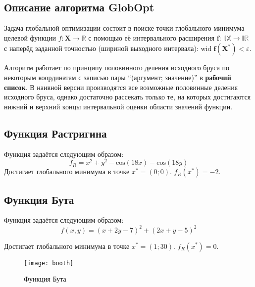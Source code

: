 \subsection{Описание алгоритма GlobOpt}

Задача глобальной оптимизации состоит в поиске точки глобального минимума целевой функции $f: \mathbf{X} \rightarrow \mathbb{R}$ с помощью её интервального расширения $\mathbf{f}: \; \mathbb{IX} \rightarrow \mathbb{IR}$ с наперёд заданной точностью (шириной выходного интервала): $\textrm{wid} \; \mathbf{f(X^*)} < \varepsilon$.

Алгоритм \cite{globopt} работает по принципу половинного деления исходного бруса по некоторым координатам с записью пары ``(аргумент; значение)'' в \textbf{рабочий список}. В наивной версии производятся все возможные половинные деления исходного бруса, однако достаточно рассекать только те, на которых достигаются нижний и верхний концы интервальной оценки области значений функции.

\subsection{Функция Растригина}
Функция задаётся следующим образом:
\begin{equation}
f_R = x^2 + y ^ 2 - \textrm{cos}(18x) - \textrm{cos}(18y)
\end{equation}
Достигает глобального минимума в точке $x^*=(0;0)$. $f_R(x^*)=-2$.

\subsection{Функция Бута}
Функция задаётся следующим образом:
\begin{equation}
f(x, y) = (x + 2y - 7) ^ 2 + (2x + y - 5) ^ 2
\end{equation}

Достигает глобального минимума в точке $x^*=(1;30)$. $f_R(x^*)=0$.

\begin{figure}[H]
	\begin{center}
		\texttt{[image: booth]}
		\label{pic:degenmat}
		\caption{Функция Бута}
	\end{center}
\end{figure}